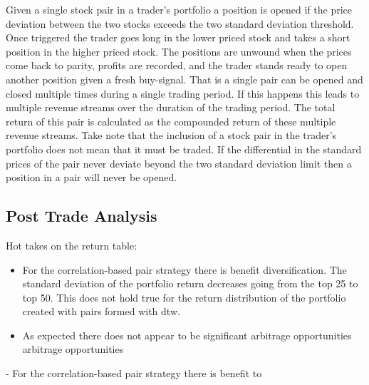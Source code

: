 \documentclass[12pt]{article}
\begin{document}
Given a single stock pair in a trader's portfolio a position is opened if the price deviation between the two stocks exceeds the two standard deviation threshold. Once triggered the trader goes long in the lower priced stock and takes a short position in the higher priced stock. The positions are unwound when the prices come back to parity, profits are recorded, and the trader stands ready to open another position given a fresh buy-signal. That is a single pair can be opened and closed multiple times during a single trading period. If this happens this leads to multiple revenue streams over the duration of the trading period. The total return of this pair is calculated as the compounded return of these multiple revenue streams. Take note that the inclusion of a stock pair in the trader's portfolio does not mean that it must be traded. If the differential in the standard prices of the pair never deviate beyond the two standard deviation limit then a position in a pair will never be opened.

\subsection{Post Trade Analysis}


Hot takes on the return table:
\begin{itemize}
    \item For the correlation-based pair strategy there is benefit diversification. The standard deviation of the portfolio return decreases going from the top 25 to top 50. This does not hold true for the return distribution of the portfolio created with pairs formed with dtw.
    \item As expected there does not appear to be significant arbitrage opportunities arbitrage opportunities 
\end{itemize}
- For the correlation-based pair strategy there is benefit to 
\end{document}
